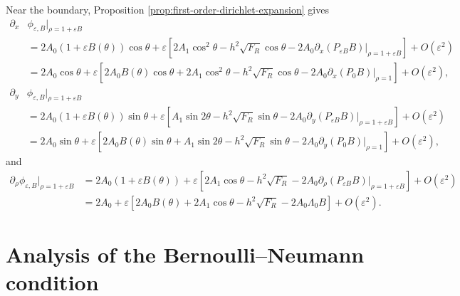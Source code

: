 \documentclass[12pt,reqno]{amsart}
\numberwithin{equation}{section}
\theoremstyle{definition}
\theoremstyle{remark}
\begin{document}
Near the boundary, Proposition \ref{prop:first-order-dirichlet-expansion} gives
\begin{equation*} 
\begin{split}
\partial_x&\phi_{\varepsilon,B}\big|_{\rho=1+\varepsilon B}\\
&=2A_0(1+\varepsilon B(\theta))\cos\theta+\varepsilon\left[2A_1\cos^2\theta-h^2\sqrt{F_R}\cos\theta-2A_0\partial_x(P_{\varepsilon B}B)|_{\rho=1+\varepsilon B}\right]+O(\varepsilon^2)\\
&=2A_0 \cos\theta+\varepsilon\left[2A_0  B(\theta)\cos\theta+2A_1\cos^2\theta-h^2\sqrt{F_R}\cos\theta-2A_0\partial_x(P_{0}B)|_{\rho=1 }\right]+O(\varepsilon^2),
\end{split}
\end{equation*}
\begin{equation*} 
\begin{split}
\partial_y&\phi_{\varepsilon,B}\big|_{\rho=1+\varepsilon B}\\
&=2A_0(1+\varepsilon B(\theta))\sin\theta+\varepsilon\left[A_1\sin2\theta-h^2\sqrt{F_R}\sin\theta-2A_0\partial_y(P_{\varepsilon B}B)|_{\rho=1+\varepsilon B}\right]+O(\varepsilon^2)\\
&=2A_0 \sin\theta+\varepsilon\left[2A_0  B(\theta)\sin\theta+A_1\sin2\theta-h^2\sqrt{F_R}\sin\theta-2A_0\partial_y(P_{0}B)|_{\rho=1}\right]+O(\varepsilon^2),
\end{split}
\end{equation*}
and
\begin{equation}\label{eq:prho-phi}
\begin{split}
\partial_{\rho}\phi_{\varepsilon,B}\big|_{\rho=1+\varepsilon B}&=  2A_0(1+\varepsilon B(\theta))+\varepsilon \left[  2A_1 \cos\theta-  h^2\sqrt{F_R} 
-2 A_0\partial_{\rho}(P_{\varepsilon B}B)|_{\rho=1+\varepsilon B}\right] 
+O(\varepsilon^2) \\
&=2A_0 +\varepsilon \left[ 2A_0 B(\theta)+ 2A_1 \cos\theta-  h^2\sqrt{F_R} 
-2 A_0 \Lambda_{0}B  \right] 
+O(\varepsilon^2).
\end{split}
\end{equation}



\section{Analysis of the Bernoulli--Neumann condition}\label{sec:neumann-analysis}
\end{document}
